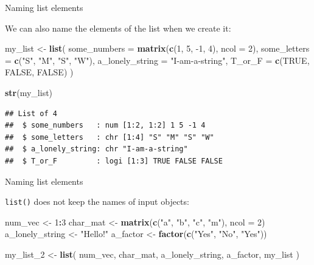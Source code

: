 \documentclass[ignorenonframetext,]{beamer}
\newenvironment{Shaded}{\begin{snugshade}}{\end{snugshade}}
\newcommand{\DataTypeTok}[1]{\textcolor[rgb]{0.13,0.29,0.53}{#1}}
\newcommand{\DecValTok}[1]{\textcolor[rgb]{0.00,0.00,0.81}{#1}}
\newcommand{\KeywordTok}[1]{\textcolor[rgb]{0.13,0.29,0.53}{\textbf{#1}}}
\newcommand{\NormalTok}[1]{#1}
\newcommand{\OperatorTok}[1]{\textcolor[rgb]{0.81,0.36,0.00}{\textbf{#1}}}
\newcommand{\OtherTok}[1]{\textcolor[rgb]{0.56,0.35,0.01}{#1}}
\newcommand{\StringTok}[1]{\textcolor[rgb]{0.31,0.60,0.02}{#1}}
\begin{document}
\begin{frame}[fragile]{Naming list elements}
\protect\hypertarget{naming-list-elements-2}{}

We can also name the elements of the list when we create it:

\begin{Shaded}
\begin{Highlighting}[]
\NormalTok{my_list <-}\StringTok{ }\KeywordTok{list}\NormalTok{(}
  \DataTypeTok{some_numbers =} \KeywordTok{matrix}\NormalTok{(}\KeywordTok{c}\NormalTok{(}\DecValTok{1}\NormalTok{, }\DecValTok{5}\NormalTok{, }\DecValTok{-1}\NormalTok{, }\DecValTok{4}\NormalTok{), }\DataTypeTok{ncol =} \DecValTok{2}\NormalTok{),}
  \DataTypeTok{some_letters =} \KeywordTok{c}\NormalTok{(}\StringTok{"S"}\NormalTok{, }\StringTok{"M"}\NormalTok{, }\StringTok{"S"}\NormalTok{, }\StringTok{"W"}\NormalTok{),}
  \DataTypeTok{a_lonely_string =} \StringTok{"I-am-a-string"}\NormalTok{,}
  \DataTypeTok{T_or_F =} \KeywordTok{c}\NormalTok{(}\OtherTok{TRUE}\NormalTok{, }\OtherTok{FALSE}\NormalTok{, }\OtherTok{FALSE}\NormalTok{)}
\NormalTok{)}

\KeywordTok{str}\NormalTok{(my_list)}
\end{Highlighting}
\end{Shaded}

\begin{verbatim}
## List of 4
##  $ some_numbers   : num [1:2, 1:2] 1 5 -1 4
##  $ some_letters   : chr [1:4] "S" "M" "S" "W"
##  $ a_lonely_string: chr "I-am-a-string"
##  $ T_or_F         : logi [1:3] TRUE FALSE FALSE
\end{verbatim}

\end{frame}

\begin{frame}[fragile]{Naming list elements}
\protect\hypertarget{naming-list-elements-3}{}

\texttt{list()} does not keep the names of input objects:

\begin{Shaded}
\begin{Highlighting}[]
\NormalTok{num_vec <-}\StringTok{ }\DecValTok{1}\OperatorTok{:}\DecValTok{3}
\NormalTok{char_mat <-}\StringTok{ }\KeywordTok{matrix}\NormalTok{(}\KeywordTok{c}\NormalTok{(}\StringTok{"a"}\NormalTok{, }\StringTok{"b"}\NormalTok{, }\StringTok{"c"}\NormalTok{, }\StringTok{"m"}\NormalTok{), }\DataTypeTok{ncol =} \DecValTok{2}\NormalTok{)}
\NormalTok{a_lonely_string <-}\StringTok{ "Hello!"}
\NormalTok{a_factor <-}\StringTok{ }\KeywordTok{factor}\NormalTok{(}\KeywordTok{c}\NormalTok{(}\StringTok{"Yes"}\NormalTok{, }\StringTok{"No"}\NormalTok{, }\StringTok{"Yes"}\NormalTok{))}

\NormalTok{my_list_}\DecValTok{2}\NormalTok{ <-}\StringTok{ }\KeywordTok{list}\NormalTok{(}
\NormalTok{  num_vec,}
\NormalTok{  char_mat,}
\NormalTok{  a_lonely_string,}
\NormalTok{  a_factor,}
\NormalTok{  my_list }
\NormalTok{  )}
\end{Highlighting}
\end{Shaded}

\end{frame}
\end{document}
